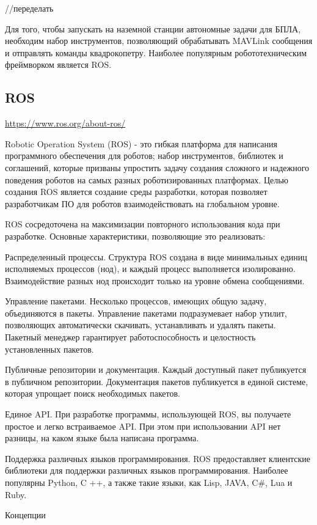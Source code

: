 //переделать

Для того, чтобы запускать на наземной станции автономные задачи для БПЛА, необходим набор инструментов, позволяющий обрабатывать MAVLink сообщения и отправлять команды квадрокопетру. Наиболее популярным робототехническим фреймворком является ROS.
\subsection{ROS}
\url{https://www.ros.org/about-ros/}

Robotic Operation System (ROS) - это гибкая платформа для написания программного обеспечения для роботов; набор инструментов, библиотек и соглашений, которые призваны упростить задачу создания сложного и надежного поведения роботов на самых разных роботизированных платформах.
\cite{ros}
Целью создания ROS является создание среды разработки, которая позволяет разработчикам ПО для роботов взаимодействовать на глобальном уровне.

ROS сосредоточена на максимизации повторного использования кода при разработке. Основные характеристики, позволяющие это реализовать:

Распределенный процессы. Структура ROS создана в виде минимальных единиц исполняемых процессов (нод), и каждый процесс выполняется изолированно. Взаимодействие разных нод происходит только на уровне обмена сообщениями.

Управление пакетами. Несколько процессов, имеющих общую задачу, объединяются в пакеты. Управление пакетами подразумевает набор утилит, позволяющих автоматически скачивать, устанавливать и удалять пакеты. Пакетный менеджер гарантирует работоспособность и целостность установленных пакетов.

Публичные репозитории и документация. Каждый доступный пакет публикуется в публичном репозитории. Документация пакетов публикуется в единой системе, которая упрощает поиск необходимых пакетов.

Единое API. При разработке программы, использующей ROS, вы получаете простое и легко встраиваемое API. При этом при использовании API нет разницы, на каком языке была написана программа.

Поддержка различных языков программирования. ROS предоставляет клиентские библиотеки для поддержки различных языков программирования. Наиболее популярны Python, C ++, а также такие языки, как Lisp, JAVA, C\#, Lua и Ruby.
\cite{voltbro}

Концепции

